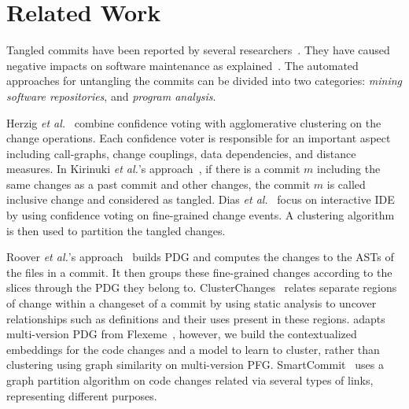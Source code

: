 \section{Related Work}
\label{related:sec}

Tangled commits have been reported by several
researchers~\cite{tao-fse12,kim-emse16,kim-msr13,hill-tse12,nguyen-issre13,flexeme-fse20,smartcommit-fse21}. They
have caused negative impacts on software maintenance as
explained~\cite{tao-fse12,flexeme-fse20,nguyen-issre13}.
The automated approaches for untangling the commits can be divided
into two categories: {\em mining software repositories}, and {\em
  program analysis}.

 Herzig {\em et
  al.}~\cite{kim-msr13,kim-emse16} combine confidence voting with
agglomerative clustering on the change operations. Each confidence
voter is responsible for an important aspect including call-graphs,
change couplings, data dependencies, and distance measures. In
Kirinuki {\em et al.}'s approach~\cite{higo-apsec16, higo-icpc14}, if
there is a commit $m$ including the same changes as a past commit and
other changes, the commit $m$ is called inclusive change and
considered as tangled.  Dias {\em et al.}~\cite{dias-saner15} focus on
interactive IDE by using confidence voting on fine-grained change
events. A clustering algorithm is then used to partition the tangled
changes.


 Roover {\em et al.}'s
approach~\cite{roover-scam18} builds PDG and computes the changes to
the ASTs of the files in a commit. It then groups these fine-grained
changes according to the slices through the PDG they belong to.
ClusterChanges~\cite{barnett-icse15} relates separate regions of
change within a changeset of a commit by using static analysis to
uncover relationships such as definitions and their uses present in
these regions. {\tool} adapts multi-version PDG from
Flexeme~\cite{flexeme-fse20}, however, we build the contextualized
embeddings for the code changes and a model to learn to cluster,
rather than clustering using graph similarity on multi-version PFG.
SmartCommit~\cite{smartcommit-fse21} uses a graph partition algorithm
on code changes related via several types of links, representing
different purposes.

